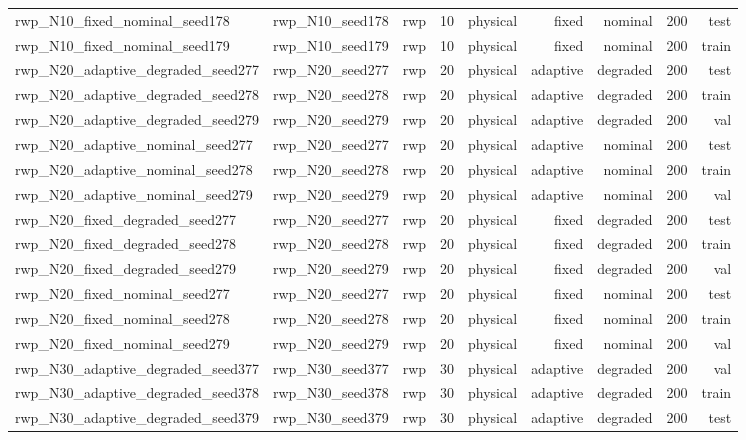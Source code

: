 \begin{tabular}{lrrrrrrrr}
rwp\_N10\_fixed\_nominal\_seed178 & rwp\_N10\_seed178 & rwp & 10 & physical & fixed & nominal & 200 & test \\
rwp\_N10\_fixed\_nominal\_seed179 & rwp\_N10\_seed179 & rwp & 10 & physical & fixed & nominal & 200 & train \\
rwp\_N20\_adaptive\_degraded\_seed277 & rwp\_N20\_seed277 & rwp & 20 & physical & adaptive & degraded & 200 & test \\
rwp\_N20\_adaptive\_degraded\_seed278 & rwp\_N20\_seed278 & rwp & 20 & physical & adaptive & degraded & 200 & train \\
rwp\_N20\_adaptive\_degraded\_seed279 & rwp\_N20\_seed279 & rwp & 20 & physical & adaptive & degraded & 200 & val \\
rwp\_N20\_adaptive\_nominal\_seed277 & rwp\_N20\_seed277 & rwp & 20 & physical & adaptive & nominal & 200 & test \\
rwp\_N20\_adaptive\_nominal\_seed278 & rwp\_N20\_seed278 & rwp & 20 & physical & adaptive & nominal & 200 & train \\
rwp\_N20\_adaptive\_nominal\_seed279 & rwp\_N20\_seed279 & rwp & 20 & physical & adaptive & nominal & 200 & val \\
rwp\_N20\_fixed\_degraded\_seed277 & rwp\_N20\_seed277 & rwp & 20 & physical & fixed & degraded & 200 & test \\
rwp\_N20\_fixed\_degraded\_seed278 & rwp\_N20\_seed278 & rwp & 20 & physical & fixed & degraded & 200 & train \\
rwp\_N20\_fixed\_degraded\_seed279 & rwp\_N20\_seed279 & rwp & 20 & physical & fixed & degraded & 200 & val \\
rwp\_N20\_fixed\_nominal\_seed277 & rwp\_N20\_seed277 & rwp & 20 & physical & fixed & nominal & 200 & test \\
rwp\_N20\_fixed\_nominal\_seed278 & rwp\_N20\_seed278 & rwp & 20 & physical & fixed & nominal & 200 & train \\
rwp\_N20\_fixed\_nominal\_seed279 & rwp\_N20\_seed279 & rwp & 20 & physical & fixed & nominal & 200 & val \\
rwp\_N30\_adaptive\_degraded\_seed377 & rwp\_N30\_seed377 & rwp & 30 & physical & adaptive & degraded & 200 & val \\
rwp\_N30\_adaptive\_degraded\_seed378 & rwp\_N30\_seed378 & rwp & 30 & physical & adaptive & degraded & 200 & train \\
rwp\_N30\_adaptive\_degraded\_seed379 & rwp\_N30\_seed379 & rwp & 30 & physical & adaptive & degraded & 200 & test \\

\end{tabular}
